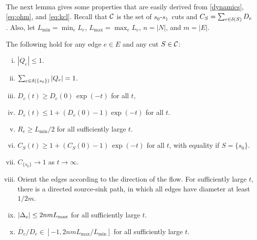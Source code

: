 \documentclass[11pt,a4paper]{article}
\renewcommand{\source}{\ensuremath{s_0}}
\renewcommand{\sink}{\ensuremath{s_1}}
\newcommand{\Lmin}{\ensuremath{L_{\mathrm{min}}}}
\newcommand{\Lmax}{\ensuremath{L_{\mathrm{max}}}}
\begin{document}
The next lemma gives some properties that are easily derived from
\eqref{dynamics}, \eqref{eq:ohm}, and \eqref{eq:kcl}. Recall that ${\cal C}$ is
the set of \source-\sink\ cuts and $\capa(S)=\sum_{e \in \delta(S)} D_e$. Also,
let $\Lmin=\min_e L_e$, $\Lmax=\max_e L_e$, $n=|N|$, and $m=|E|$.  
\begin{lemma}
\label{lem:basic-properties}
The following hold for any edge $e \in E$ and any cut $S \in {\cal C}$: 
\begin{enumerate}[(i)]
\item
\label{lem:flow-bound}
$|Q_e| \leq 1$. 
\item
\label{lem:source-flow}
$\sum_{e \in \delta(\{s_0\})} | Q_e | = 1$. 
\item 
$D_e(t) \ge D_e(0) \, \exp(-t)$ for all $t$,  
\item
\label{lem:boundedness}
$D_e(t) \le 1 + (D_e(0) - 1) \exp(-t)$ for all $t$. 
\item
\label{lem:r-bounded}
$R_e \ge \Lmin / 2$ for all sufficiently large $t$. 
\item
\label{lem:cut}
$C_S(t) \ge 1 + (C_S(0)-1) \, \exp(-t)$ for all $t$, with equality if $S=\{s_0\}$.   
\item
\label{lem:source-cut}
$C_{\{s_0\}} \to 1$ as $t \to \infty.$ 
\item 
\label{lem:large diameter path}
Orient the edges according to the direction of the flow. 
For sufficiently large $t$, there is a directed source-sink path, in which all
edges have diameter at
least $1/2m$. 

\item
\label{lem:Delta-bound}
$\abs{\Delta_e} \le 2 nm \Lmax$ for all sufficiently large $t$.  

\item
\label{lem:ddot-over-d}
$\dot{D_e}/D_e \in [-1, 2nm\Lmax/\Lmin]$ for all sufficiently large $t$. 
\end{enumerate}
\end{lemma}
\end{document}
